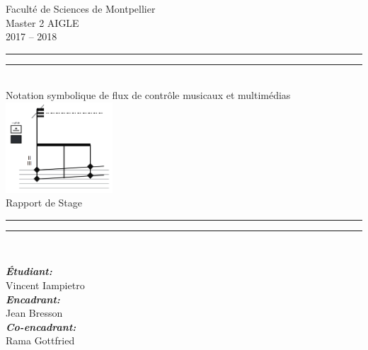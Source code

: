 \begin{titlepage}
\begin{center}
\begin{sffamily}

{\large
Faculté de Sciences de Montpellier \\[.5cm]
Master 2 AIGLE\\2017 -- 2018\\[2cm]
}


\rule{\textwidth}{1.6pt}\vspace*{-\baselineskip}\vspace*{2pt} 
\rule{\textwidth}{0.4pt}\\[\baselineskip]
{\LARGE
Notation symbolique de flux de contrôle musicaux et multimédias\\[0.7\baselineskip]
\includegraphics[width=0.3\textwidth]{Paratextes/i/logo.png}
\\[0.5\baselineskip]
Rapport de Stage
}\\[0.2\baselineskip] 
\rule{\textwidth}{0.4pt}\vspace*{-\baselineskip}\vspace{3.2pt}
\rule{\textwidth}{1.6pt}\\[\baselineskip]
\vspace*{2\baselineskip}

\noindent
\begin{center}
     \large
    \emph{\textbf{Étudiant:}}\\
    Vincent Iampietro \\
    \smallskip
    \large
    \emph{\textbf{Encadrant:}}\\
    Jean Bresson\\
    \emph{\textbf{Co-encadrant:}}\\
    Rama Gottfried
\end{center}%



\end{sffamily}
\end{center}
\end{titlepage}